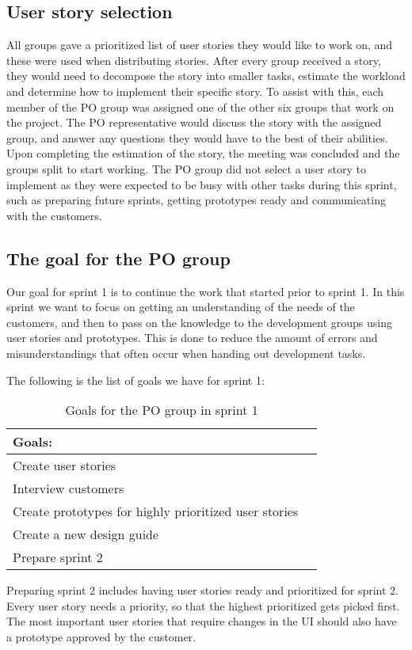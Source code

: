 \subsection{User story selection}
All groups gave a prioritized list of user stories they would like to work on, and these were used when distributing stories.
After every group received a story, they would need to decompose the story into smaller tasks, estimate the workload and determine how to implement their specific story.
To assist with this, each member of the PO group was assigned one of the other six groups that work on the project. 
The PO representative would discuss the story with the assigned group, and answer any questions they would have to the best of their abilities.
Upon completing the estimation of the story, the meeting was concluded and the groups split to start working.
The PO group did not select a user story to implement as they were expected to be busy with other tasks during this sprint, such as preparing future sprints, getting prototypes ready and communicating with the customers.

\subsection{The goal for the PO group}
Our goal for sprint 1 is to continue the work that started prior to sprint 1.
In this sprint we want to focus on getting an understanding of the needs of the customers, and then to pass on the knowledge to the development groups using user stories and prototypes.
This is done to reduce the amount of errors and misunderstandings that often occur when handing out development tasks.

\noindent
The following is the list of goals we have for sprint 1:
\begin{table}[H]
    \centering
    \begin{tabular}{|l|l|}
    \hline
    Goals:                                \\ \hline
    Create user stories                   \\ \hline
    Interview customers                    \\ \hline
    Create prototypes for highly prioritized user stories \\ \hline
    Create a new design guide                \\ \hline
    Prepare sprint 2                       \\ \hline
    \end{tabular}
    \caption{Goals for the PO group in sprint 1}
    \label{PO-goal-sprint-1}
\end{table}
\noindent
Preparing sprint 2 includes having user stories ready and prioritized for sprint 2.
Every user story needs a priority, so that the highest prioritized gets picked first.
The most important user stories that require changes in the UI should also have a prototype approved by the customer.
